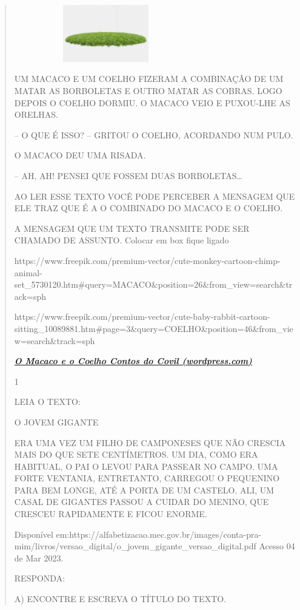 {{{{\begin{verse}
{{\begin{escolha}
{{{{\includegraphics[width=3.14122in,height=0.97761in]{media/image118.jpeg}

UM MACACO E UM COELHO FIZERAM A COMBINAÇÃO DE UM MATAR AS BORBOLETAS E
OUTRO MATAR AS COBRAS. LOGO DEPOIS O COELHO DORMIU. O MACACO VEIO E
PUXOU-LHE AS ORELHAS.

-- O QUE É ISSO? -- GRITOU O COELHO, ACORDANDO NUM PULO.

O MACACO DEU UMA RISADA.

-- AH, AH! PENSEI QUE FOSSEM DUAS BORBOLETAS\ldots{}

AO LER ESSE TEXTO VOCÊ PODE PERCEBER A MENSAGEM QUE ELE TRAZ QUE É A O
COMBINADO DO MACACO E O COELHO.

A MENSAGEM QUE UM TEXTO TRANSMITE PODE SER CHAMADO DE ASSUNTO. Colocar
em box fique ligado

https://www.freepik.com/premium-vector/cute-monkey-cartoon-chimp-animal-set\_5730120.htm\#query=MACACO\&position=26\&from\_view=search\&track=sph

https://www.freepik.com/premium-vector/cute-baby-rabbit-cartoon-sitting\_10089881.htm\#page=3\&query=COELHO\&position=46\&from\_view=search\&track=sph

\href{https://contosdocovil.wordpress.com/2008/05/17/o-macaco-e-o-coelho/}{\textbf{\emph{O
Macaco e o Coelho \textbar{} Contos do Covil (wordpress.com)}}}


\num{1}

LEIA O TEXTO:

O JOVEM GIGANTE

ERA UMA VEZ UM FILHO DE CAMPONESES QUE NÃO CRESCIA MAIS DO QUE SETE
CENTÍMETROS. UM DIA, COMO ERA HABITUAL, O PAI O LEVOU PARA PASSEAR NO
CAMPO. UMA FORTE VENTANIA, ENTRETANTO, CARREGOU O PEQUENINO PARA BEM
LONGE, ATÉ A PORTA DE UM CASTELO. ALI, UM CASAL DE GIGANTES PASSOU A
CUIDAR DO MENINO, QUE CRESCEU RAPIDAMENTE E FICOU ENORME.

Disponível
em:https://alfabetizacao.mec.gov.br/images/conta-pra-mim/livros/versao\_digital/o\_jovem\_gigante\_versao\_digital.pdf
Acesso 04 de Mar 2023.

RESPONDA:

A) ENCONTRE E ESCREVA O TÍTULO DO TEXTO.

}}}}
\end{escolha}}}
\end{verse}}}}}
